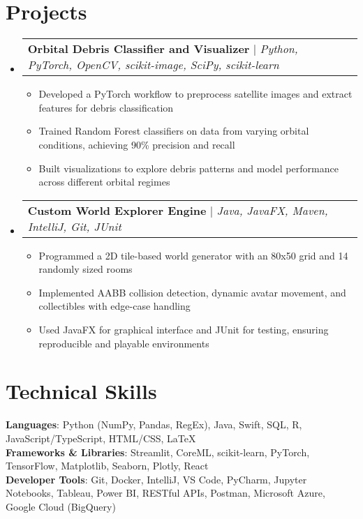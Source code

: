 \documentclass[letterpaper,11pt]{article}
\makeatletter
\newcommand{\resumeItem}[1]{
  \item\small{
    {#1 \vspace{-2pt}}
  }
}
\newcommand{\resumeProjectHeading}[2]{
    \item
    \begin{tabular*}{0.97\textwidth}{l@{\extracolsep{\fill}}r}
      \small#1 & #2 \\
    \end{tabular*}\vspace{-7pt}
}
\newcommand{\resumeSubHeadingListStart}{\begin{itemize}[leftmargin=0.15in, label={}]}
\newcommand{\resumeSubHeadingListEnd}{\end{itemize}}
\newcommand{\resumeItemListStart}{\begin{itemize}}
\newcommand{\resumeItemListEnd}{\end{itemize}\vspace{-5pt}}
\makeatother
\begin{document}
\section{Projects}
    \resumeSubHeadingListStart
      \resumeProjectHeading
          {\textbf{Orbital Debris Classifier and Visualizer} $|$ \emph{Python, PyTorch, OpenCV, scikit-image, SciPy, scikit-learn}}{}
          \resumeItemListStart
            \resumeItem{Developed a PyTorch workflow to preprocess satellite images and extract features for debris classification}
            \resumeItem{Trained Random Forest classifiers on data from varying orbital conditions, achieving 90\% precision and recall}
            \resumeItem{Built visualizations to explore debris patterns and model performance across different orbital regimes}
          \resumeItemListEnd
      \resumeProjectHeading
          {\textbf{Custom World Explorer Engine} $|$ \emph{Java, JavaFX, Maven, IntelliJ, Git, JUnit}}{}
          \resumeItemListStart
            \resumeItem{Programmed a 2D tile-based world generator with an 80x50 grid and 14 randomly sized rooms}
            \resumeItem{Implemented AABB collision detection, dynamic avatar movement, and collectibles with edge-case handling}
            \resumeItem{Used JavaFX for graphical interface and JUnit for testing, ensuring reproducible and playable environments}
          \resumeItemListEnd
    \resumeSubHeadingListEnd



%
\section{Technical Skills}
 \begin{itemize}[leftmargin=0.15in, label={}]
    \small{\item{
     \textbf{Languages}{: Python (NumPy, Pandas, RegEx), Java, Swift, SQL, R, JavaScript/TypeScript, HTML/CSS, LaTeX} \\
     \textbf{Frameworks \& Libraries}{: Streamlit, CoreML, scikit-learn, PyTorch, TensorFlow, Matplotlib, Seaborn, Plotly, React} \\
     \textbf{Developer Tools}{: Git, Docker, IntelliJ, VS Code, PyCharm, Jupyter Notebooks, Tableau, Power BI, RESTful APIs, Postman, Microsoft Azure, Google Cloud (BigQuery)}
    }}
 \end{itemize}


\end{document}
